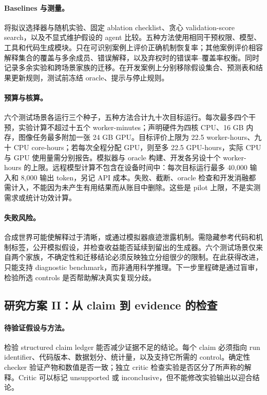 \paragraph{Baselines 与测量。}
将拟议选择器与随机实验、固定 ablation checklist、贪心 validation-score search，以及不显式维护假设的 agent 比较。五种方法使用相同干预权限、模型、工具和代码生成模块。只在可识别案例上评价正确机制恢复率；其他案例评价相容解释集合的覆盖与多余成员、错误解释，以及弃权时的错误率--覆盖率权衡。同时记录多余实验和跨场景家族的迁移。在开发案例上分别移除假设集合、预测表和结果更新规则，测试前冻结 oracle、提示与停止规则。

\paragraph{预算与核算。}
六个测试场景各运行三个种子，五种方法合计九十次目标运行。每次最多四个干预，实验计算不超过十五个 worker-minutes；声明硬件为四核 CPU、16 GB 内存，图像任务最多附加一张 24 GB GPU。目标评价上限为 22.5 worker-hours、九十 CPU core-hours；若每次全程分配 GPU，则至多 22.5 GPU-hours，实际 CPU 与 GPU 使用量需分别报告。模拟器与 oracle 构建、开发各另设十个 worker-hours 的上限。远程模型计算不包含在设备时间中：每次目标运行最多 40,000 输入和 8,000 输出 token，另记 API 成本。失败、截断、oracle 检查和开发消融都需计入，不能因为未产生有用结果而从账目中删除。这些是 pilot 上限，不是实测需求或统计功效计算。

\paragraph{失败风险。}
合成世界可能使解释过于清晰，或通过模拟器痕迹泄露机制。需隐藏参考代码和机制标签，公开模拟假设，并检查收益能否延续到留出的生成器。六个测试场景仅来自两个家族，不确定性和迁移结论必须反映独立分组很少的限制。在此获得改进，只能支持 diagnostic benchmark，而非通用科学推理。下一步里程碑是通过盲审，检验所选 controls 是否帮助解决真实复现分歧。

\subsection{研究方案 II：从 claim 到 evidence 的检查}

\paragraph{待验证假设与方法。}
检验 structured claim ledger 能否减少证据不足的结论。每个 claim 必须指向 run identifier、代码版本、数据划分、统计量，以及支持它所需的 control。确定性 checker 验证产物和数值是否一致；独立 critic 检查实验是否区分了所声称的解释。Critic 可以标记 unsupported 或 inconclusive，但不能修改实验输出以迎合结论。

